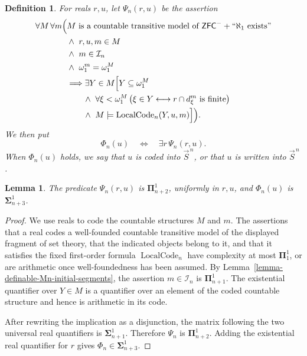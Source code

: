 \documentclass[a4paper,11pt]{article}
\newtheorem{lemma}[theorem]{Lemma}
\newtheorem{definition}[theorem]{Definition}
\newcommand{\ZFCminus}{\mathsf{ZFC}^{-}}
\begin{document}
\begin{definition}
\label{definition-Psi-Phi-Mn}
For reals $r,u$, let $\Psi_n(r,u)$ be the assertion
\begin{align*}
\forall M\,\forall m\Big(&
   M\text{ is a countable transitive model of }
      \ZFCminus+``\aleph_1\text{ exists}"\\
&\wedge\ r,u,m\in M\\
&\wedge\ m\in\mathcal I_n\\
&\wedge\ \omega_1^m=\omega_1^M\\
&\Longrightarrow
   \exists Y\in M\Big[
      Y\subseteq\omega_1^M\\
&\qquad\wedge\
      \forall\xi<\omega_1^M\,
      \bigl(\xi\in Y
      \longleftrightarrow
      r\cap d^m_\xi\text{ is finite}\bigr)\\
&\qquad\wedge\
      M\models\operatorname{LocalCode}_n(Y,u,m)
   \Big]\Big).
\end{align*}
We then put
\[
   \Phi_n(u)
   \quad\Longleftrightarrow\quad
   \exists r\,\Psi_n(r,u).
\]
When $\Phi_n(u)$ holds, we say that $u$ is \emph{coded into}
$\vec S^{\,n}$, or that $u$ is \emph{written into} $\vec S^{\,n}$.
\end{definition}

\begin{lemma}
\label{lemma-complexity-Psi-Phi-Mn}
The predicate $\Psi_n(r,u)$ is
$\boldsymbol{\Pi}^1_{n+2}$, uniformly in $r,u$, and $\Phi_n(u)$ is
$\boldsymbol{\Sigma}^1_{n+3}$.
\end{lemma}

\begin{proof}
We use reals to code the countable structures $M$ and $m$.  The assertions
that a real codes a well-founded countable transitive model of the displayed
fragment of set theory, that the indicated objects belong to it, and that it
satisfies the fixed first-order formula
$\operatorname{LocalCode}_n$ have complexity at most
$\boldsymbol{\Pi}^1_1$, or are arithmetic once well-foundedness has been
assumed.  By Lemma~\ref{lemma-definable-Mn-initial-segments}, the assertion
$m\in\mathcal I_n$ is $\boldsymbol{\Pi}^1_{n+1}$.  The existential
quantifier over $Y\in M$ is a quantifier over an element of the coded
countable structure and hence is arithmetic in its code.

After rewriting the implication as a disjunction, the matrix following the
two universal real quantifiers is $\boldsymbol{\Sigma}^1_{n+1}$.  Therefore
$\Psi_n$ is $\boldsymbol{\Pi}^1_{n+2}$.  Adding the existential real
quantifier for $r$ gives
$\Phi_n\in\boldsymbol{\Sigma}^1_{n+3}$.
\end{proof}
\end{document}
